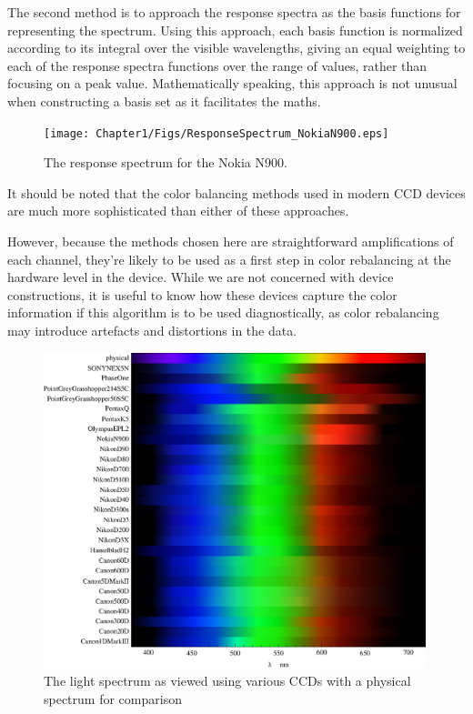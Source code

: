 The second method is to approach the response spectra as the basis functions for representing the spectrum. Using this approach, each basis function is normalized according to its integral over the visible wavelengths, giving an equal weighting to each of the response spectra functions over the range of values, rather than focusing on a peak value. Mathematically speaking, this approach is not unusual when constructing a basis set as it facilitates the maths.

\begin{figure}[h!]
  \centering
    \texttt{[image: Chapter1/Figs/ResponseSpectrum\_NokiaN900.eps]}
    \caption{The response spectrum for the Nokia N900. }  \label{fig:ResponseSpectumNokia}
\end{figure}



It should be noted that the color balancing methods used in modern CCD devices are much more sophisticated than either of these approaches.

However, because the methods chosen here are straightforward amplifications of each channel, they're likely to be used as a first step in color rebalancing at the hardware level in the device. While we are not concerned with device constructions, it is useful to know how these devices capture the color information if this algorithm is to be used diagnostically, as color rebalancing may introduce artefacts and distortions in the data.


\begin{figure}[h!]
  \centering
    \includegraphics[width=0.99\textwidth]{Chapter1/Figs/ResponseSpectraStripes.eps}
    \caption{The light spectrum as viewed using various CCDs with a physical spectrum for comparison }  \label{fig:ResponseSpectraStripes}
\end{figure}

